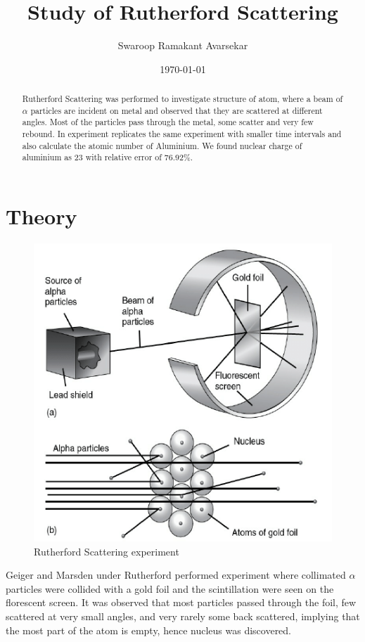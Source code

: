 \documentclass[a4paper, amsfonts, amssymb, amsmath, reprint, showkeys, nofootinbib, twoside]{revtex4-1}
\begin{document}
\title{Study of Rutherford Scattering}
\author{Swaroop Ramakant Avarsekar}
\date{\today}

\begin{abstract}
Rutherford Scattering was performed to investigate structure of atom, where a beam of $\alpha$ particles are incident on metal and observed that they are scattered at different angles. Most of the particles pass through the metal, some scatter and very few rebound. In experiment replicates the same experiment with smaller time intervals and also calculate the atomic number of Aluminium. We found nuclear charge of aluminium as 23 with relative error of 76.92\%.
\end{abstract}


\maketitle

\section{Theory}

\begin{figure}[H]
	\centering
	\includegraphics[scale=0.4]{1}
	\caption{Rutherford Scattering experiment}
\end{figure}
Geiger and Marsden under Rutherford performed experiment where collimated $\alpha$ particles were collided with a gold foil and the scintillation were seen on the florescent screen. It was observed that most particles passed through the foil, few scattered at very small angles, and very rarely some back scattered, implying that the most part of the atom is empty, hence nucleus was discovered.
\end{document}
